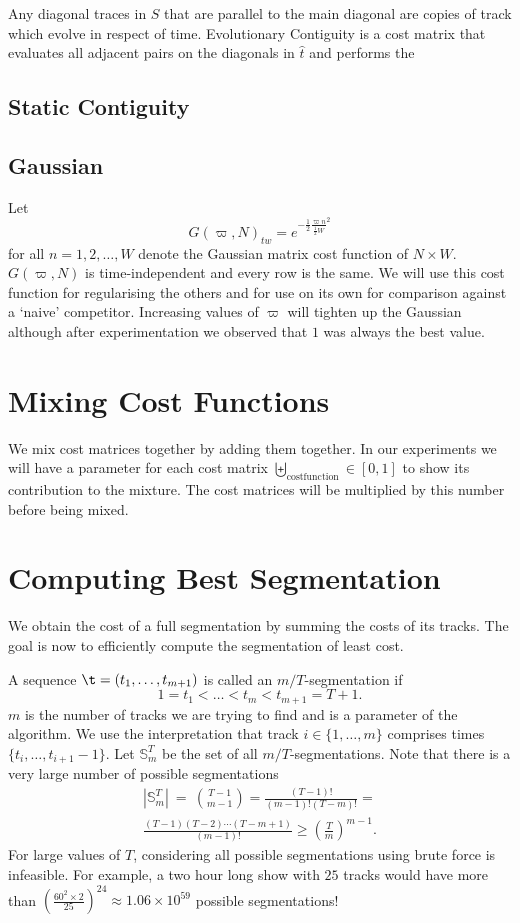 \documentclass[twocolumn]{article}
\newcommand{\segs}{\mathbb S}
\begin{document}
	Any diagonal traces in $S$ that are parallel to the main diagonal are copies of track which evolve in respect of time. Evolutionary Contiguity is a cost matrix that evaluates all adjacent pairs on the diagonals in $\hat t$ and performs the 
	
	\subsection{Static Contiguity}
	
	\subsection{Gaussian}
	Let \[
	G( \varpi, N )_{tw} = e^{ - \frac{1}{2} \frac{\varpi n}{ \frac{1}{2} W}^2  }
	\] for all $n=1,2,\ldots,W$ denote the Gaussian matrix cost function of $N\times W$. $G( \varpi, N )$ is time-independent and every row is the same. We will use this cost function for regularising the others and for use on its own for comparison against a `naive' competitor. Increasing values of $\varpi$ will tighten up the Gaussian although after experimentation we observed that $1$ was always the best value.
	
	\section{Mixing Cost Functions}
	
	We mix cost matrices together by adding them together. In our experiments we will have a parameter for each cost matrix $\biguplus_{\mathrm{costfunction}} \in [0,1]$ to show its contribution to the mixture. The cost matrices will be multiplied by this number before being mixed. 
	
	\section{Computing Best Segmentation}\label{best_cost}
	
	We obtain the cost of a full segmentation by summing the costs of its tracks. The goal is now to efficiently compute the segmentation of least cost.
	
	
	A sequence $\t = (t_1, \ldots, t_{m+1})$ is called an $m/T$-segmentation if
	\[
	1 = t_1 < \ldots < t_m < t_{m+1} = T+1.
	\]
	$m$ is the number of tracks we are trying to find and is a parameter of the algorithm. We use the interpretation that track $i \in \{1, \ldots, m\}$ comprises times $\{t_i, \ldots, t_{i+1}-1\}$. Let $\segs^T_m$ be the set of all $m/T$-segmentations. Note that there is a very large number of possible segmentations 
	\begin{multline*}
		|\segs^T_m| ~=~ \binom{T-1}{m-1}
		= \frac{(T-1)!}{(m-1)!(T-m)!} =\\
		\frac{(T-1)(T-2)\cdots(T-m+1)}{(m-1)!} \ge \left( \frac{T}{m}\right)^{m-1}.
	\end{multline*} 
	For large values of $T$, considering all possible segmentations using brute force is infeasible. For example, a two hour long show with $25$ tracks would have more than $\left( \frac{60^2 \times 2}{25}\right)^{24}  \approx 1.06 \times 10^{59}$ possible segmentations! 
	
\end{document}
